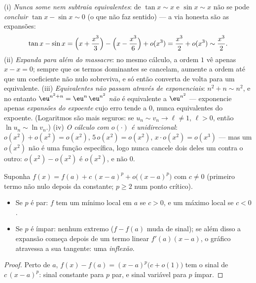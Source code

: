 \begin{remark}
(i) \emph{Nunca some nem subtraia equivalentes}: de $\tan x \sim
x$ e $\sin x \sim x$ não
se pode \emph{concluir} $\tan x -
\sin x \sim 0$ (o que não faz sentido) --- a via
honesta são as expansões:
\[
\tan x - \sin x
= \Bigl(x + \frac{x^3}{3}\Bigr) - \Bigl(x - \frac{x^3}{6}\Bigr)
+ o(x^3) = \frac{x^3}{2} + o(x^3) \sim \frac{x^3}{2} .
\]
(ii) \emph{Expanda para além do massacre}: no mesmo cálculo, a ordem
$1$ vê apenas $x - x = 0$; sempre que os termos dominantes se cancelam,
aumente a ordem até que um coeficiente não nulo sobreviva, e só então
converta de volta para um equivalente. (iii) \emph{Equivalentes não
passam através de exponenciais}: $n^2 + n \sim n^2$, e no entanto $\eu^{n^2+n} = \eu^{n}\,\eu^{n^2}$ \emph{não}
é equivalente a $\eu^{n^2}$ --- exponencie apenas \emph{expansões do
expoente} cujo erro tende a $0$, nunca equivalentes do expoente.
(Logaritmos são mais seguros: se $u_n \sim v_n \to \ell \neq
1$, $\ell > 0$, então $\ln u_n \sim \ln v_n$.) (iv)
\emph{O cálculo com $o(\cdot)$ é unidirecional}: $o(x^2) + o(x^2) =
o(x^2)$, $5\,o(x^2) = o(x^2)$, $x\cdot o(x^2) = o(x^3)$ ---
mas um $o(x^2)$ não é uma função específica, logo nunca cancele dois
deles um contra o outro: $o(x^2) - o(x^2)$ é $o(x^2)$, e não $0$.
\end{remark}

\begin{proposition}\label{prop:b1:taylor:local}
Suponha $f(x) = f(a) + c\,(x - a)^p + o\bigl((x-a)^p\bigr)$ com $c
\neq 0$ (primeiro termo não nulo depois da constante;
$p \geq 2$ num ponto crítico).
\begin{itemize}
  \item Se $p$ é par: $f$ tem um mínimo local em $a$ se $c > 0$, e um
        máximo local se $c < 0$.
  \item Se $p$ é ímpar: nenhum extremo ($f - f(a)$ muda de sinal); se além
        disso a expansão começa depois de um termo linear $f'(a)(x
        - a)$, o
        gráfico atravessa a sua tangente: uma \emph{inflexão}.
\end{itemize}
\end{proposition}

\begin{proof}
Perto de $a$, $f(x) - f(a) = (x-a)^p\bigl(c + o(1)\bigr)$ tem o sinal de $c\,(x-a)^p$: sinal constante para $p$
par, e sinal variável para $p$ ímpar.
\end{proof}

